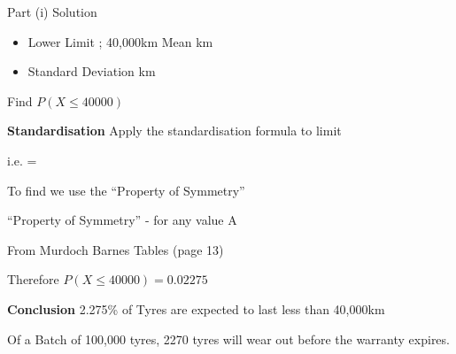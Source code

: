﻿\documentclass[]{report}
\begin{document}
Part (i) Solution

\begin{itemize}
\item Lower Limit ; 40,000km			Mean		 km	
\item Standard Deviation	 km
\end{itemize}

Find  $P(X \leq 40000)$

\noindent \textbf{Standardisation}
Apply the standardisation formula	 	to limit


i.e.  = 

To find   we use the “Property of Symmetry”

“Property of Symmetry” -   for any value A


From Murdoch Barnes Tables (page 13)  

Therefore $P(X \leq 40000)  = 0.02275$ 

\textbf{Conclusion}
2.275\% of Tyres are expected to last less than 40,000km

Of a Batch of 100,000 tyres,  2270 tyres will wear out before the warranty expires.
\end{document}
